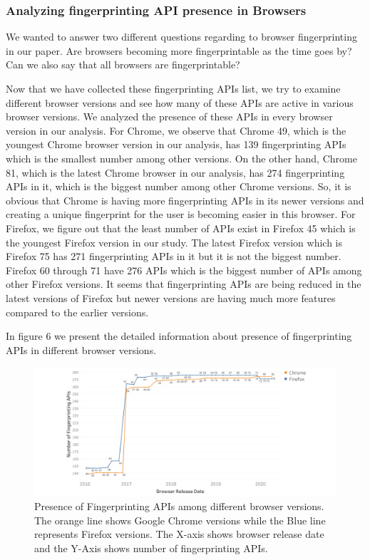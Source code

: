 



\subsubsection{Analyzing fingerprinting API presence in Browsers}
We wanted to answer two different questions regarding to browser fingerprinting in our paper. Are browsers becoming more fingerprintable as the time goes by? Can we also say that all browsers are fingerprintable?

Now that we have collected these fingerprinting APIs list, we try to examine different browser versions and see how many of these APIs are active in various browser versions.
We analyzed the presence of these APIs in every browser version in our analysis. For Chrome, we observe that Chrome 49, which is the youngest Chrome browser version in our analysis, has 139 fingerprinting APIs which is the smallest number among other versions.
On the other hand, Chrome 81, which is the latest Chrome browser in our analysis, has 274 fingerprinting APIs in it, which is the biggest number among other Chrome versions. So, it is obvious that Chrome is having more fingerprinting APIs in its newer versions and creating a unique fingerprint for the user is becoming easier in this browser. 
For Firefox, we figure out that the least number of APIs exist in Firefox 45 which is the youngest Firefox version in our study. The latest Firefox version which is Firefox 75 has 271 fingerprinting APIs in it but it is not the biggest number. Firefox 60 through 71 have 276 APIs which is the biggest number of APIs among other Firefox versions. It seems that fingerprinting APIs are being reduced in the latest versions of Firefox but newer versions are having much more features compared to the earlier versions.

In figure 6 we present the detailed information about presence of fingerprinting APIs in different browser versions.

\begin{figure}[ht]
    \centering
    \includegraphics[width=\columnwidth]{figures/Fingerprinting-APIs.png}
    \caption{Presence of Fingerprinting APIs among different browser versions. The orange line shows Google Chrome versions while the Blue line represents Firefox versions. The X-axis shows browser release date and the Y-Axis shows number of fingerprinting APIs.}
    \label{fig:fingerprint-apis}
\end{figure}


